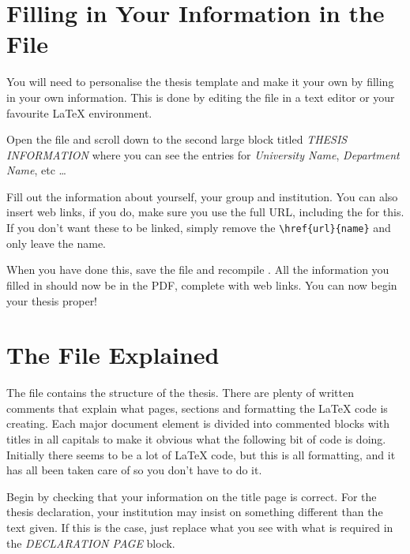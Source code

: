 
\section{Filling in Your Information in the  File}\label{FillingFile}

You will need to personalise the thesis template and make it your own by filling in your own information. This is done by editing the  file in a text editor or your favourite LaTeX environment.

Open the file and scroll down to the second large block titled \emph{THESIS INFORMATION} where you can see the entries for \emph{University Name}, \emph{Department Name}, etc \ldots

Fill out the information about yourself, your group and institution. You can also insert web links, if you do, make sure you use the full URL, including the  for this. If you don't want these to be linked, simply remove the \verb|\href{url}{name}| and only leave the name.

When you have done this, save the file and recompile . All the information you filled in should now be in the PDF, complete with web links. You can now begin your thesis proper!


\section{The  File Explained}

The  file contains the structure of the thesis. There are plenty of written comments that explain what pages, sections and formatting the \LaTeX{} code is creating. Each major document element is divided into commented blocks with titles in all capitals to make it obvious what the following bit of code is doing. Initially there seems to be a lot of \LaTeX{} code, but this is all formatting, and it has all been taken care of so you don't have to do it.

Begin by checking that your information on the title page is correct. For the thesis declaration, your institution may insist on something different than the text given. If this is the case, just replace what you see with what is required in the \emph{DECLARATION PAGE} block.

